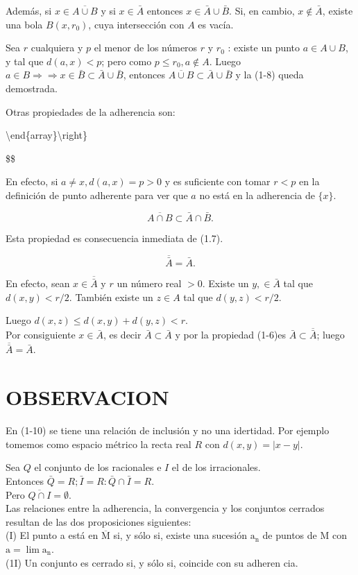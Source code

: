 \documentclass[10pt]{article}
\theoremstyle{plain}
\theoremstyle{definition}
\theoremstyle{remark}
\begin{document}
Además, si $x \in \overline{A \cup B}$ y si $x \in \bar{A}$ entonces $x \in \bar{A} \cup \bar{B}$. Si, en cambio, $x \notin \bar{A}$, existe una bola $B\left(x, r_{0}\right)$, cuya intersección con $A$ es vacía.

Sea $r$ cualquiera y $p$ el menor de los números $r$ y $r_{0}$ : existe un punto $a \in A \cup B$, y tal que $d(a, x)<p$; pero como $p \leqslant r_{0}, a \notin A$. Luego $a \in B \Rightarrow \Rightarrow x \in \bar{B} \subset \bar{A} \cup \bar{B}$, entonces $\overline{A \cup B} \subset \bar{A} \cup \bar{B}$ y la (1-8) queda demostrada.

Otras propiedades de la adherencia son:

\textbackslash end\{array\}\textbackslash right\}

\$\$

En efecto, si $a \neq x, d(a, x)=p>0$ y es suficiente con tomar $r<p$ en la definición de punto adherente para ver que $a$ no está en la adherencia de $\{x\}$.


\begin{equation*}
\overline{A \cap B} \subset \bar{A} \cap \bar{B} . \tag{1-10}
\end{equation*}


Esta propiedad es consecuencia inmediata de (1.7).


\begin{equation*}
\overline{\bar{A}}=\bar{A} . \tag{1-1}
\end{equation*}


En efecto, sean $x \in \overline{\bar{A}}$ y $r$ un número real $>0$. Existe un $y, \in \bar{A}$ tal que $d(x, y)<r / 2$. También existe un $z \in A$ tal que $d(y, z)<r / 2$.

Luego $d(x, z) \leqslant d(x, y)+d(y, z)<r$.\\
Por consiguiente $x \in \bar{A}$, es decir $\bar{A} \subset \bar{A}$ y por la propiedad (1-6)es $\bar{A} \subset \overline{\bar{A}}$; luego $\overline{\bar{A}}=\bar{A}$.

\section*{OBSERVACION}
En (1-10) se tiene una relación de inclusión y no una idertidad. Por ejemplo tomemos como espacio métrico la recta real $R$ con $d(x, y)=|x-y|$.

Sea $Q$ el conjunto de los racionales e $I$ el de los irracionales.\\
Entonces $\bar{Q}=R ; \bar{I}=R: \bar{Q} \cap \bar{I}=R$.\\
Pero $\overline{Q \cap I}=\emptyset$.\\
Las relaciones entre la adherencia, la convergencia y los conjuntos cerrados resultan de las dos proposiciones siguientes:\\
(I) El punto a está en $\overline{\mathrm{M}}$ si, y sólo si, existe una sucesión $\mathrm{a}_{\mathrm{n}}$ de puntos de M con $\mathrm{a}=\lim \mathrm{a}_{\mathrm{n}}$.\\
(1I) Un conjunto es cerrado si, y sólo si, coincide con su adheren cia.
\end{document}
